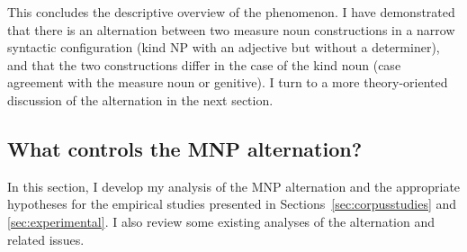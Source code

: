 % 

This concludes the descriptive overview of the phenomenon.
I have demonstrated that there is an alternation between two measure noun constructions in a narrow syntactic configuration (kind NP with an adjective but without a determiner), and that the two constructions differ in the case of the kind noun (case agreement with the measure noun or genitive).
I turn to a more theory-oriented discussion of the alternation in the next section.


\subsection{What controls the MNP alternation?}
\label{sec:analyses}

In this section, I develop my analysis of the MNP alternation and the appropriate hypotheses for the empirical studies presented in Sections~\ref{sec:corpusstudies} and \ref{sec:experimental}.
I also review some existing analyses of the alternation and related issues.

